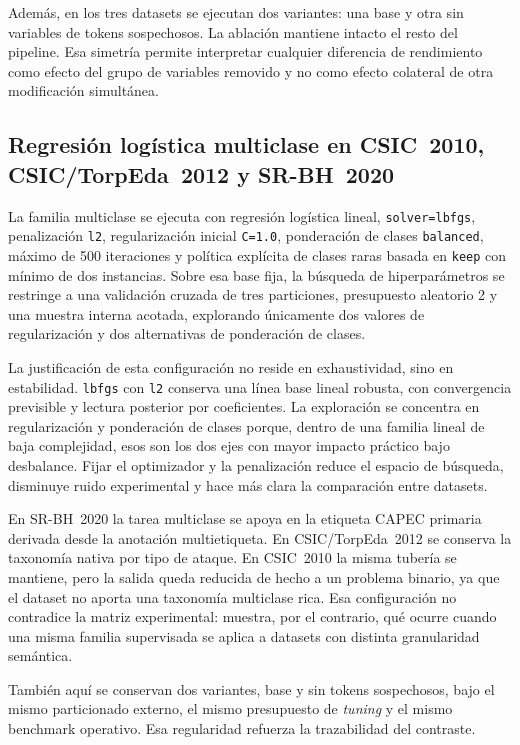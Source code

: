 \documentclass[12pt,oneside]{report}
\begin{document}
Además, en los tres datasets se ejecutan dos variantes: una base y otra sin variables de tokens sospechosos. La ablación mantiene intacto el resto del pipeline. Esa simetría permite interpretar cualquier diferencia de rendimiento como efecto del grupo de variables removido y no como efecto colateral de otra modificación simultánea.

\subsection{Regresión logística multiclase en CSIC~2010, CSIC/TorpEda~2012 y SR-BH~2020}
La familia multiclase se ejecuta con regresión logística lineal, \texttt{solver=lbfgs}, penalización \texttt{l2}, regularización inicial \texttt{C=1.0}, ponderación de clases \texttt{balanced}, máximo de 500 iteraciones y política explícita de clases raras basada en \texttt{keep} con mínimo de dos instancias. Sobre esa base fija, la búsqueda de hiperparámetros se restringe a una validación cruzada de tres particiones, presupuesto aleatorio 2 y una muestra interna acotada, explorando únicamente dos valores de regularización y dos alternativas de ponderación de clases.

La justificación de esta configuración no reside en exhaustividad, sino en estabilidad. \texttt{lbfgs} con \texttt{l2} conserva una línea base lineal robusta, con convergencia previsible y lectura posterior por coeficientes. La exploración se concentra en regularización y ponderación de clases porque, dentro de una familia lineal de baja complejidad, esos son los dos ejes con mayor impacto práctico bajo desbalance. Fijar el optimizador y la penalización reduce el espacio de búsqueda, disminuye ruido experimental y hace más clara la comparación entre datasets.

En SR-BH~2020 la tarea multiclase se apoya en la etiqueta CAPEC primaria derivada desde la anotación multietiqueta. En CSIC/TorpEda~2012 se conserva la taxonomía nativa por tipo de ataque. En CSIC~2010 la misma tubería se mantiene, pero la salida queda reducida de hecho a un problema binario, ya que el dataset no aporta una taxonomía multiclase rica. Esa configuración no contradice la matriz experimental: muestra, por el contrario, qué ocurre cuando una misma familia supervisada se aplica a datasets con distinta granularidad semántica.

También aquí se conservan dos variantes, base y sin tokens sospechosos, bajo el mismo particionado externo, el mismo presupuesto de \textit{tuning} y el mismo benchmark operativo. Esa regularidad refuerza la trazabilidad del contraste.
\end{document}
